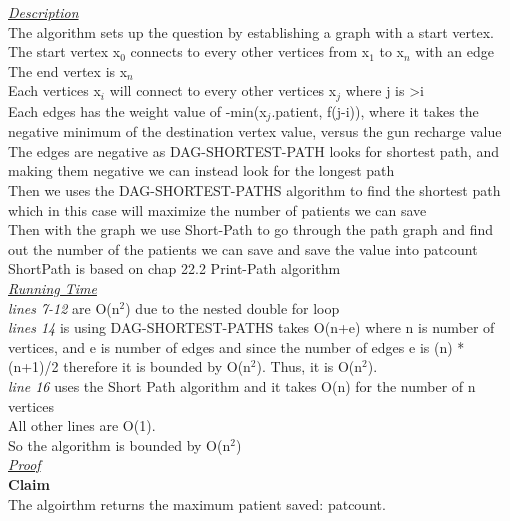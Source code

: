 \documentclass[10pt]{csc_assignment}
\begin{document}
\begin{description}
\emph{\underline{Description}}\\
The algorithm sets up the question by establishing a graph with a start vertex. \\
The start vertex x$_{0}$ connects to every other vertices from x$_{1}$ to x$_{n}$ with an edge\\
The end vertex is x$_{n}$\\
Each vertices x$_{i}$ will connect to every other vertices  x$_{j}$ where j is \textgreater i \\ 
Each edges has the weight value of -min(x$_{j}$.patient, f(j-i)), where it takes the negative minimum of the destination vertex value, versus the gun recharge value \\
The edges are negative as DAG-SHORTEST-PATH looks for shortest path, and making them negative we can instead look for the longest path\\
 Then we uses the DAG-SHORTEST-PATHS algorithm to find the shortest path which in this case will maximize the number of patients we can save\\
Then with the graph we use Short-Path to go through the path graph and find out the number of the patients we can save and save the value into patcount\\
ShortPath is based on chap 22.2 Print-Path algorithm\\

\emph{\underline{Running Time}}\\
\emph{lines 7-12 } are O(n$^{2}$) due to the nested double for loop \\
\emph{lines 14} is using DAG-SHORTEST-PATHS takes O(n+e) where n is number of vertices, and e is number of edges and since the number of edges e is (n) * (n+1)/2 therefore it is bounded by O(n$^{2}$). Thus, it is O(n$^{2}$). \\
\emph{line 16} uses the Short Path algorithm and it takes O(n) for the number of n vertices\\
All other lines are O(1).\\
So the algorithm is bounded by O(n$^{2}$) \\

\emph{\underline{Proof}}\\
\textbf{Claim}\\
The algoirthm returns the maximum patient saved: patcount.\\
  

\end{description}
\end{document}

